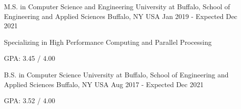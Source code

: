 

\begin{cventries}


  \cventry
    {M.S. in Computer Science and Engineering} %
    {University at Buffalo, School of Engineering and Applied Sciences} %
    {Buffalo, NY USA} %
    {Jan 2019 - Expected Dec 2021} %
    {
      \begin{cvitems} %
        \item {Specializing in High Performance Computing and Parallel Processing}
        \item {GPA: 3.45 / 4.00}
      \end{cvitems}
    }


  \cventry
    {B.S. in Computer Science} %
    {University at Buffalo, School of Engineering and Applied Sciences} %
    {Buffalo, NY USA} %
    {Aug 2017 - Expected Dec 2021} %
    {
      \begin{cvitems} %
        \item {GPA: 3.52 / 4.00}
      \end{cvitems}
    }

\end{cventries}
